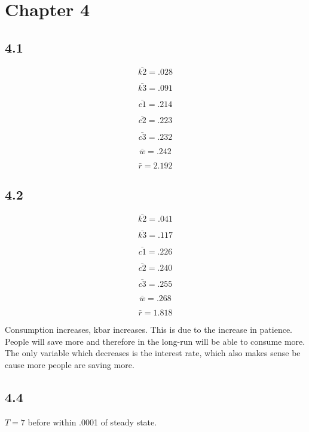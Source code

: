 \documentclass[letterpaper,12pt]{article}
\theoremstyle{definition}
\begin{document}
\section*{Chapter 4}

\subsection*{4.1}

 \[ \bar{k2} = .028\]

 \[ \bar{k3} = .091\]

 \[ \bar{c1} = .214\]

 \[ \bar{c2} = .223\]

 \[ \bar{c3} = .232\]

 \[ \bar{w} = .242\]

 \[ \bar{r} = 2.192\]

\subsection*{4.2}

 \[ \bar{k2} = .041\]

 \[ \bar{k3} = .117\]

 \[ \bar{c1} = .226\]

 \[ \bar{c2} = .240\]

 \[ \bar{c3} = .255\]

 \[ \bar{w} = .268\]

 \[ \bar{r} = 1.818\]

 Consumption increases, kbar increases. This is due to the increase in patience. People will save more and therefore in the long-run will be able to consume more. The only variable which decreases is the interest rate, which also makes sense be cause more people are saving more.

\subsection*{4.4}

$T = 7$ before within .0001 of steady state.

\end{document}
